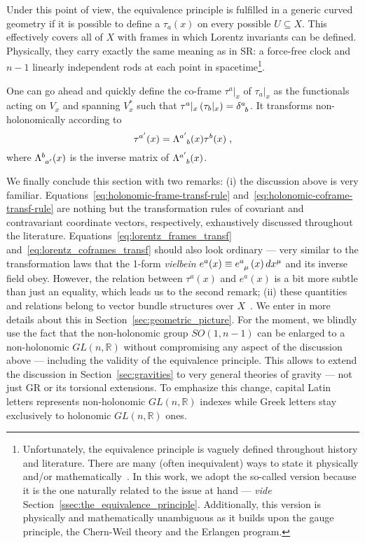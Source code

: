 \documentclass[../../main.tex]{subfiles}
\begin{document}
Under this point of view, the equivalence principle is fulfilled in a generic curved geometry if it is possible to define a $\tau_a(x)$ on every possible $ U \subseteq X $. This effectively covers all of $X$ with frames in which Lorentz invariants can be defined. Physically, they carry exactly the same meaning as in SR\@: a force-free clock and $n-1$ linearly independent rods at each point in spacetime\footnote{ Unfortunately, the equivalence principle is vaguely defined throughout history and literature. There are many (often inequivalent) ways to state it physically and/or mathematically~\cite{ivanenko1983a,sardanashvily1994a,dicasola2015a,paunkovic2022a,capozziello2024a}. In this work, we adopt the so-called  version because it is the one naturally related to the issue at hand --- \textit{vide} Section~\ref{ssec:the_equivalence_principle}. Additionally, this version is physically and mathematically unambiguous as it builds upon the gauge principle, the Chern-Weil theory and the Erlangen program. }.

One can go ahead and quickly define the co-frame $\tau^a|_x$ of $\tau_a|_x$ as the functionals acting on $V_x$ and spanning $V_x^*$ such that $\tau^a|_x \left(\tau_b|_x\right)=\tensor{\delta}{^a_b}$. It transforms non-holonomically according to
\begin{equation}
  \label{eq:lorentz_coframes_transf}
  {\tau}^{a'}(x) = \tensor{\Lambda}{^{a'}_b}(x)\tau^b(x) \;,
\end{equation}
where $\tensor{\Lambda}{^b_{a'}}(x)$ is the inverse matrix of $\tensor{\Lambda}{^{a'}_b}(x)$.

We finally conclude this section with two remarks: (i) the discussion above is very familiar. Equations~\eqref{eq:holonomic-frame-transf-rule} and~\eqref{eq:holonomic-coframe-transf-rule} are nothing but the transformation rules of covariant and contravariant coordinate vectors, respectively, exhaustively discussed throughout the literature. Equations~\eqref{eq:lorentz_frames_transf} and~\eqref{eq:lorentz_coframes_transf} should also look ordinary --- very similar to the transformation laws that the 1-form \textit{vielbein} $e^a(x)\equiv \tensor{e}{^a_\mu}\left(x\right)dx^\mu$ and its inverse field obey. However, the relation between $\tau^a(x)$ and $e^a(x)$ is a bit more subtle than just an equality, which leads us to the second remark; (ii) these quantities and relations belong to vector bundle structures over $X$~\cite{trautman1970}. We enter in more details about this in Section~\ref{sec:geometric_picture}. For the moment, we blindly use the fact that the non-holonomic group $SO(1,n-1)$ can be enlarged to a non-holonomic $GL(n,\mathbb{R})$ without compromising any aspect of the discussion above --- including the validity of the equivalence principle. This allows to extend the discussion in Section~\ref{sec:gravities} to very general theories of gravity --- not just GR or its torsional extensions. To emphasize this change, capital Latin letters represents non-holonomic $GL(n,\mathbb{R})$ indexes while Greek letters stay exclusively to holonomic $GL(n,\mathbb{R})$ ones.
\end{document}

